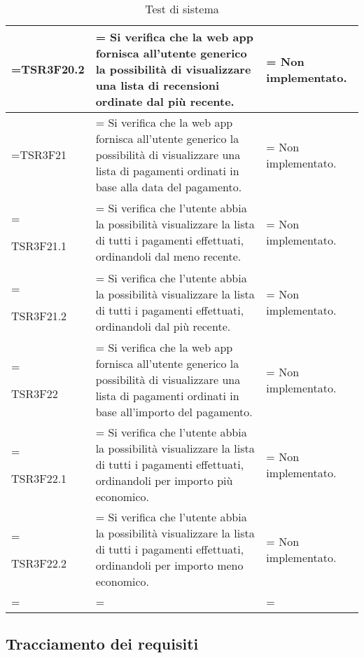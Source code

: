 \begin{xltabular}{\textwidth} {
        >{\hsize\linewidth=\hsize}X
        >{\hsize\linewidth=\hsize}X
        >{\hsize\linewidth=\hsize}X
    }
    TSR3F20.2 &
    Si verifica che la web app fornisca all'utente generico la possibilità di visualizzare una lista di recensioni ordinate dal più recente. &
    Non implementato. 
    \\ \hline

    TSR3F21 &
    Si verifica che la web app fornisca all'utente generico la possibilità di visualizzare una lista di pagamenti ordinati in base alla data del pagamento. &
    Non implementato. 
    \\ \hline

    TSR3F21.1 &
    Si verifica che l'utente abbia la possibilità visualizzare la lista di tutti i pagamenti
    effettuati, ordinandoli dal meno recente. &
    Non implementato.
    \\ \hline

    TSR3F21.2 &
    Si verifica che l'utente abbia la possibilità visualizzare la lista di tutti i pagamenti
    effettuati, ordinandoli dal più recente. &
    Non implementato.
    \\ \hline

    TSR3F22 &
    Si verifica che la web app fornisca all'utente generico la possibilità di visualizzare una lista di pagamenti ordinati in base all'importo del pagamento. &
    Non implementato. 
    \\ \hline

    TSR3F22.1 &
    Si verifica che l'utente abbia la possibilità visualizzare la lista di tutti i pagamenti
    effettuati, ordinandoli per importo più economico. &
    Non implementato.
    \\ \hline
    
    TSR3F22.2 &
    Si verifica che l'utente abbia la possibilità visualizzare la lista di tutti i pagamenti
    effettuati, ordinandoli per importo meno economico. &
    Non implementato.
    \\ \hline


    \caption{Test di sistema}
\end{xltabular}

\subsection{Tracciamento dei requisiti}

